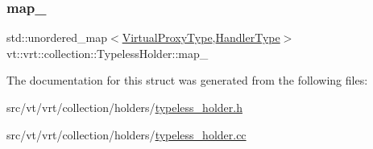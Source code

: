 \mbox{\label{structvt_1_1vrt_1_1collection_1_1_typeless_holder_a2b77bd58e627e46859fd85702f8cc4de}} 
\subsubsection{\texorpdfstring{map\+\_\+}{map\_}}
{\footnotesize\ttfamily std\+::unordered\+\_\+map$<$\hyperlink{namespacevt_a1b417dd5d684f045bb58a0ede70045ac}{Virtual\+Proxy\+Type},\hyperlink{namespacevt_af64846b57dfcaf104da3ef6967917573}{Handler\+Type}$>$ vt\+::vrt\+::collection\+::\+Typeless\+Holder\+::map\+\_\+\hspace{0.3cm}{\ttfamily [private]}}



The documentation for this struct was generated from the following files\+:\begin{DoxyCompactItemize}
\item 
src/vt/vrt/collection/holders/\hyperlink{typeless__holder_8h}{typeless\+\_\+holder.\+h}\item 
src/vt/vrt/collection/holders/\hyperlink{typeless__holder_8cc}{typeless\+\_\+holder.\+cc}\end{DoxyCompactItemize}
